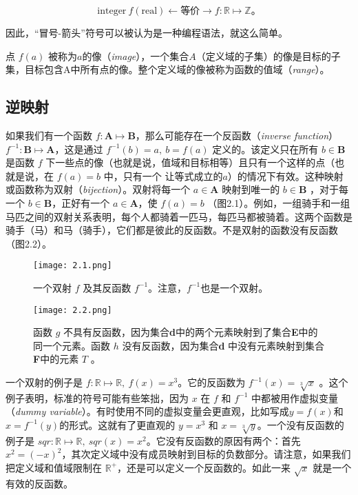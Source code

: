 \documentclass[lang=cn,12pt]{elegantbook}
\begin{document}
$$\text{integer} \ f(\text{real}) \leftarrow \text{等价} \rightarrow f : \mathbb{R} \mapsto \mathbb{Z}。$$

因此，“冒号-箭头”符号可以被认为是一种编程语法，就这么简单。

点 $f(a)$ 被称为$a$的像（\textit{image}），一个集合$A$（定义域的子集）的像是目标的子集，目标包含A中所有点的像。整个定义域的像被称为函数的值域（\textit{range}）。

\subsection{逆映射}

如果我们有一个函数 $f : \textbf{A} \mapsto \textbf{B}$，那么可能存在一个反函数（\textit{inverse function}） $f^{-1} : \textbf{B} \mapsto \textbf{A}$，这是通过 $ f^{-1}(b) = a,\ b = f(a)$ 定义的。该定义只在所有 $b \in \textbf{B}$是函数 $f$ 下一些点的像（也就是说，值域和目标相等）且只有一个这样的点（也就是说，在 $f(a) = b$ 中，只有一个 让等式成立的$a$）的情况下有效。这种映射或函数称为双射（\textit{bijection}）。双射将每一个 $a \in \textbf{A}$ 映射到唯一的 $b \in \textbf{B}$ ，对于每一个 $b \in \textbf{B}$，正好有一个 $a \in \textbf{A}$，使 $f(a)=b$ （图2.1）。例如，一组骑手和一组马匹之间的双射关系表明，每个人都骑着一匹马，每匹马都被骑着。这两个函数是骑手（马）和马（骑手），它们都是彼此的反函数。不是双射的函数没有反函数（图2.2）。

\begin{figure}[htb]
  \centering
  \begin{minipage}[t]{0.4\textwidth}
    \centering
    \texttt{[image: 2.1.png]}
    \caption{一个双射 $f$ 及其反函数 $f^{-1}$。注意，$f^{-1}$也是一个双射。}
  \end{minipage}
  \hspace*{2em}
  \begin{minipage}[t]{0.4\textwidth}
    \centering
    \texttt{[image: 2.2.png]}
    \caption{函数 $g$ 不具有反函数，因为集合\textbf{d}中的两个元素映射到了集合\textbf{E}中的同一个元素。函数 $h$ 没有反函数，因为集合\textbf{d} 中没有元素映射到集合\textbf{F}中的元素 $T$ 。}
  \end{minipage}
\end{figure}

一个双射的例子是 $f : \mathbb{R} \mapsto \mathbb{R},\ f(x) = x^3$。它的反函数为 $f^{-1}(x) = \sqrt[3]{x}$ 。这个例子表明，标准的符号可能有些笨拙，因为 $x$ 在 $f$ 和 $f^{-1}$ 中都被用作虚拟变量（\textit{dummy variable}）。有时使用不同的虚拟变量会更直观，比如写成$y = f(x)$和$x=f^{-1}(y)$的形式。这就有了更直观的 $y = x^3$ 和 $x = \sqrt[3]{y}$。一个没有反函数的例子是 $sqr : \mathbb{R} \mapsto \mathbb{R},\ sqr(x) = x^2$。它没有反函数的原因有两个：首先 $x^2 = (-x)^2$，其次定义域中没有成员映射到目标的负数部分。请注意，如果我们把定义域和值域限制在 $\mathbb{R^+}$，还是可以定义一个反函数的。如此一来 $\sqrt{x}$ 就是一个有效的反函数。
\end{document}
